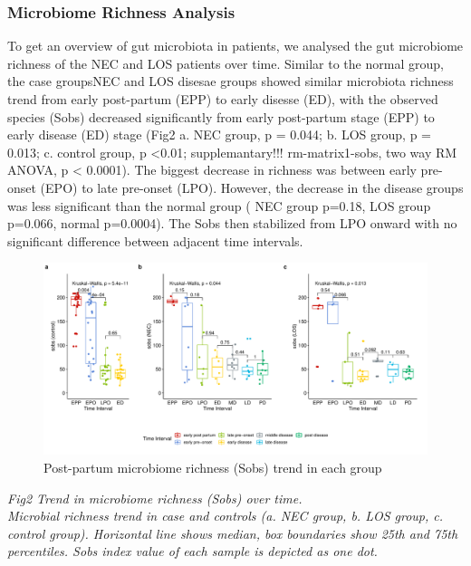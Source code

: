 \documentclass[fleqn,10pt]{wlpeerj} %
\begin{document}
    \subsubsection*{Microbiome Richness Analysis}
    To get an overview of gut microbiota in patients, we analysed the gut microbiome richness of the NEC and LOS patients over time.  Similar to the normal group, the case groupsNEC and LOS disesae  groups showed similar microbiota richness trend from early post-partum (EPP) to early disesse (ED), with the observed species (Sobs) decreased significantly from early post-partum stage (EPP) to early disease (ED) stage (Fig2 a. NEC group, p = 0.044; b. LOS group, p = 0.013; c. control group, p \textless 0.01; supplemantary!!! rm-matrix1-sobs, two way RM ANOVA, p < 0.0001).  The biggest decrease in richness was between early pre-onset (EPO) to late pre-onset (LPO).  However, the decrease in the disease groups was less significant than the normal group ( NEC group p=0.18, LOS group p=0.066, normal p=0.0004). The Sobs then stabilized from LPO onward with no significant difference between adjacent time intervals.

      \begin{figure}[ht]\centering
        \includegraphics[width=\linewidth]{figure/sobs-group-time2.pdf}
        \caption{Post-partum microbiome richness (Sobs) trend in each group}
        \label{fig:sobs-group-time}
      \end{figure}

      \textit{Fig2 Trend in microbiome richness (Sobs) over time. \\ Microbial richness trend in case and controls (a. NEC group, b. LOS group, c. control group). Horizontal line shows median, box boundaries show 25th and 75th percentiles. Sobs index value of each sample is depicted as one dot. }
\end{document}
